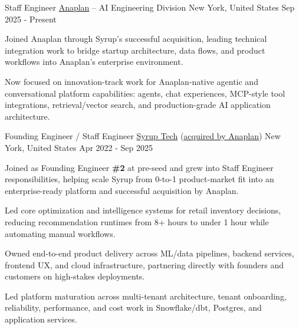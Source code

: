 

\begin{cventries}

  \cventry
    {Staff Engineer} %
    {\href{https://www.anaplan.com/}{Anaplan} -- AI Engineering Division} %
    {New York, United States} %
    {Sep 2025 - Present} %
    {
      \begin{cvitems} %
        \item {Joined Anaplan through Syrup's successful acquisition, leading technical integration work to bridge startup architecture, data flows, and product workflows into Anaplan's enterprise environment.}
        \item {Now focused on innovation-track work for Anaplan-native agentic and conversational platform capabilities: agents, chat experiences, MCP-style tool integrations, retrieval/vector search, and production-grade AI application architecture.}
      \end{cvitems}
    }
  \cventry
    {Founding Engineer / Staff Engineer} %
    {\href{https://www.syrup.tech/}{Syrup Tech} (\href{https://www.anaplan.com/news/anaplan-announces-acquisition-of-syrup-tech/}{acquired by Anaplan})} %
    {New York, United States} %
    {Apr 2022 - Sep 2025} %
    {
      \begin{cvitems} %
        \item {Joined as Founding Engineer \textbf{\#2} at pre-seed and grew into Staff Engineer responsibilities, helping scale Syrup from 0-to-1 product-market fit into an enterprise-ready platform and successful acquisition by Anaplan.}
        \item {Led core optimization and intelligence systems for retail inventory decisions, reducing recommendation runtimes from 8+ hours to under 1 hour while automating manual workflows.}
        \item {Owned end-to-end product delivery across ML/data pipelines, backend services, frontend UX, and cloud infrastructure, partnering directly with founders and customers on high-stakes deployments.}
        \item {Led platform maturation across multi-tenant architecture, tenant onboarding, reliability, performance, and cost work in Snowflake/dbt, Postgres, and application services.}
      \end{cvitems}
    }


\end{cventries}
